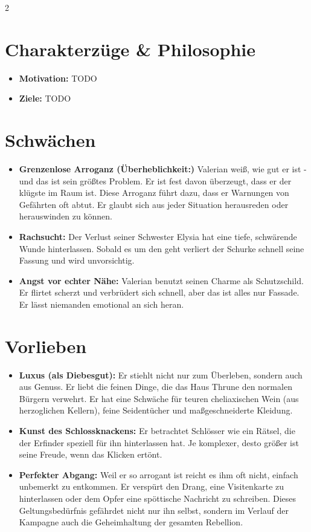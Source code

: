 \documentclass[10pt,a4paper]{article}
\begin{document}
\begin{multicols}{2}
\section{Charakterzüge \& Philosophie}
\begin{itemize}
    \item \textbf{Motivation:} TODO
    \item \textbf{Ziele:} TODO
\end{itemize}

\section{Schwächen}
\begin{itemize}
    \item \textbf{Grenzenlose Arroganz (Überheblichkeit:)} Valerian weiß, wie gut er ist - und das ist sein größtes Problem. Er ist fest davon überzeugt, dass er der klügste im Raum ist. Diese Arroganz führt dazu, dass er Warnungen von Gefährten oft abtut. Er glaubt sich aus jeder Situation herausreden oder herauswinden zu können.
    \item \textbf{Rachsucht:} Der Verlust seiner Schwester Elysia hat eine tiefe, schwärende Wunde hinterlassen. Sobald es um den  geht verliert der Schurke schnell seine Fassung und wird unvorsichtig.
    \item \textbf{Angst vor echter Nähe:} Valerian benutzt seinen Charme als Schutzschild. Er flirtet scherzt und verbrüdert sich schnell, aber das ist alles nur Fassade. Er lässt niemanden emotional an sich heran.
\end{itemize}

\section{Vorlieben}

\begin{itemize}
    \item \textbf{Luxus (als Diebesgut):} Er stiehlt nicht nur zum Überleben, sondern auch aus Genuss. Er liebt die feinen Dinge, die das Haus Thrune den normalen Bürgern verwehrt. Er hat eine Schwäche für teuren cheliaxischen Wein (aus herzoglichen Kellern), feine Seidentücher und maßgeschneiderte Kleidung.
    \item \textbf{Kunst des Schlossknackens:} Er betrachtet Schlösser wie ein Rätsel, die der Erfinder speziell für ihn hinterlassen hat. Je komplexer, desto größer ist seine Freude, wenn das Klicken ertönt.
    \item \textbf{Perfekter Abgang:} Weil er so arrogant ist reicht es ihm oft nicht, einfach unbemerkt zu entkommen. Er verspürt den Drang, eine Visitenkarte zu hinterlassen oder dem Opfer eine spöttische Nachricht zu schreiben. Dieses Geltungsbedürfnis gefährdet nicht nur ihn selbst, sondern im Verlauf der Kampagne auch die Geheimhaltung der gesamten Rebellion.
\end{itemize}



\end{multicols}
\end{document}
